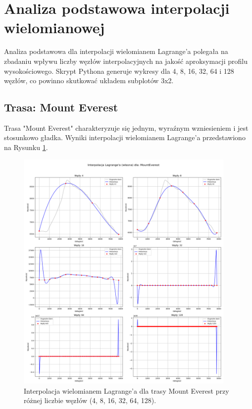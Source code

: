 \documentclass[11pt,a4paper]{article}
\begin{document}
\section{Analiza podstawowa interpolacji wielomianowej}
\label{sec:analiza_lagrange}
Analiza podstawowa dla interpolacji wielomianem Lagrange'a polegała na zbadaniu wpływu liczby węzłów interpolacyjnych na jakość aproksymacji profilu wysokościowego. Skrypt Pythona generuje wykresy dla 4, 8, 16, 32, 64 i 128 węzłów, co powinno skutkować układem subplotów 3x2.

\subsection{Trasa: Mount Everest}
Trasa "Mount Everest" charakteryzuje się jednym, wyraźnym wzniesieniem i jest stosunkowo gładka. Wyniki interpolacji wielomianem Lagrange'a przedstawiono na Rysunku \ref{fig:lagrange_everest}.

\begin{figure}[H]
    \centering
    \includegraphics[width=0.95\textwidth]{MountEverest_Lagrange_basic_subplots.png} %
    \caption{Interpolacja wielomianem Lagrange'a dla trasy Mount Everest przy różnej liczbie węzłów (4, 8, 16, 32, 64, 128).}
    \label{fig:lagrange_everest}
\end{figure}
\end{document}
